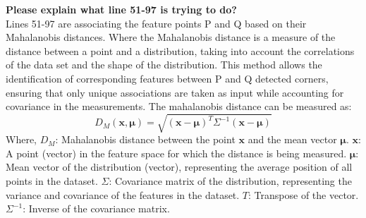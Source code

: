 \textbf{Please explain what line 51-97  is trying to do?}\\
Lines 51-97 are associating the feature points P and Q based on their Mahalanobis distances. Where the Mahalanobis distance is a measure of the distance between a point and a distribution, taking into account the correlations of the data set and the shape of the distribution. This method allows the identification of corresponding features between P and Q detected corners, ensuring that only unique associations are taken as input while accounting for covariance in the measurements. The mahalanobis distance can be measured as:
\begin{equation}
D_M(\mathbf{x}, \boldsymbol{\mu}) = \sqrt{(\mathbf{x} - \boldsymbol{\mu})^T \Sigma^{-1} (\mathbf{x} - \boldsymbol{\mu})}
\label{EQ:DM}
\end{equation}
Where, \( D_M \): Mahalanobis distance between the point \( \mathbf{x} \) and the mean vector \( \boldsymbol{\mu} \). \( \mathbf{x} \): A point (vector) in the feature space for which the distance is being measured. \( \boldsymbol{\mu} \): Mean vector of the distribution (vector), representing the average position of all points in the dataset. \( \Sigma \): Covariance matrix of the distribution, representing the variance and covariance of the features in the dataset. \( T \): Transpose of the vector. \( \Sigma^{-1} \): Inverse of the covariance matrix.\\

